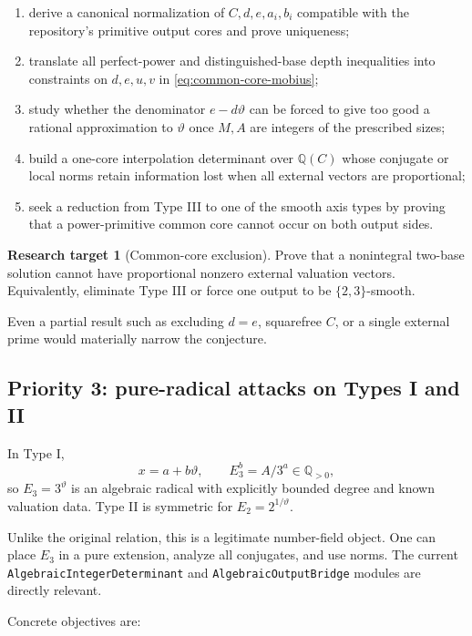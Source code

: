 \documentclass[11pt,oneside]{article}
\theoremstyle{definition}
\newtheorem{problem}[theorem]{Research target}
\theoremstyle{remark}
\newcommand{\Q}{\mathbb Q}
\begin{document}
\begin{enumerate}
\item derive a canonical normalization of $C,d,e,a_i,b_i$ compatible with the repository's
      primitive output cores and prove uniqueness;
\item translate all perfect-power and distinguished-base depth inequalities into constraints
      on $d,e,u,v$ in \eqref{eq:common-core-mobius};
\item study whether the denominator $e-d\vartheta$ can be forced to give too good a rational
      approximation to $\vartheta$ once $M,A$ are integers of the prescribed sizes;
\item build a one-core interpolation determinant over $\Q(C)$ whose conjugate or local norms
      retain information lost when all external vectors are proportional;
\item seek a reduction from Type III to one of the smooth axis types by proving that a
      power-primitive common core cannot occur on both output sides.
\end{enumerate}

\begin{problem}[Common-core exclusion]
Prove that a nonintegral two-base solution cannot have proportional nonzero external valuation
vectors.  Equivalently, eliminate Type III or force one output to be $\{2,3\}$-smooth.
\end{problem}

Even a partial result such as excluding $d=e$, squarefree $C$, or a single external prime
would materially narrow the conjecture.

\subsection{Priority 3: pure-radical attacks on Types I and II}

In Type I,
\[
  x=a+b\vartheta,
  \qquad
  E_3^b=A/3^a\in\Q_{>0},
\]
so $E_3=3^{\vartheta}$ is an algebraic radical with explicitly bounded degree and known
valuation data.  Type II is symmetric for $E_2=2^{1/\vartheta}$.

Unlike the original relation, this is a legitimate number-field object.  One can place $E_3$
in a pure extension, analyze all conjugates, and use norms.  The current
\texttt{AlgebraicIntegerDeterminant} and \texttt{AlgebraicOutputBridge} modules are directly
relevant.

Concrete objectives are:
\end{document}
